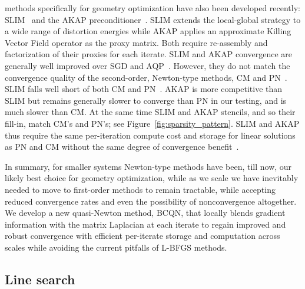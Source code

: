  methods specifically for geometry optimization
have also been developed recently: SLIM~\cite{Rabinovich:2016:SLI}
and the AKAP preconditioner~\cite{Claici:2017:IAP}. SLIM extends
the local-global strategy to a wide range of distortion energies
while AKAP applies an approximate Killing Vector Field operator as
the proxy matrix. Both require re-assembly and factorization of
their proxies for each iterate. SLIM and AKAP convergence are
generally well improved over SGD and AQP~\cite{Rabinovich:2016:SLI,Claici:2017:IAP}. However, they do not match the convergence quality
of the second-order, Newton-type methods, CM and
PN~\cite{Shtengel:2017:GOV}. SLIM falls well short of both CM and
PN~\cite{Shtengel:2017:GOV}.  AKAP is more competitive than SLIM
but remains generally slower to converge than PN in our testing,
and is much slower than CM.  At the same time SLIM and AKAP stencils,
and so their fill-in, match CM's and PN's; see
Figure~\ref{fig:sparsity_pattern}. SLIM and AKAP thus require the
same per-iteration compute cost and storage for linear solutions
as PN and CM without the same degree of convergence
benefit~\cite{Shtengel:2017:GOV}.

In summary, for smaller systems Newton-type methods have been, till
now, our likely best choice for geometry optimization, while as we
scale we have inevitably needed to move to first-order methods to
remain tractable, while accepting reduced convergence rates and
even the possibility of nonconvergence altogether.  We develop a
new quasi-Newton method, BCQN, that locally blends gradient information
with the matrix Laplacian at each iterate to regain improved and
robust convergence with efficient per-iterate storage and computation
across scales while avoiding the current pitfalls of L-BFGS methods.


\subsection{Line search}
\label{sec:rel_line_search}

